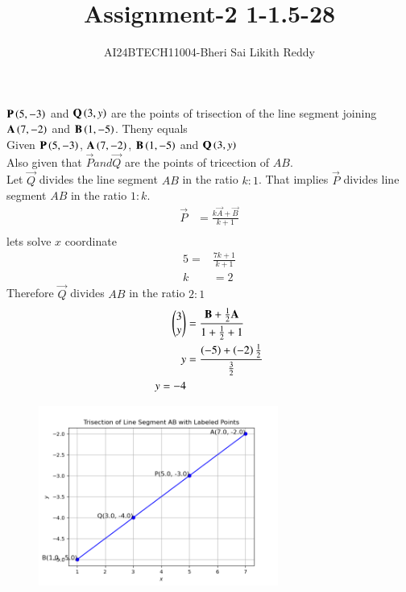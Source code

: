 \documentclass[journal]{IEEEtran}
\begin{document}

\onecolumn
\newpage
\title{Assignment-2  1-1.5-28}
\author{AI24BTECH11004-Bheri Sai Likith Reddy}
\maketitle
 $\mathbf{P}\left(5,-3\right)$ and $\mathbf{Q}\left(3,y\right)$ are the points of trisection of the line segment joining $\mathbf{A}\left(7,-2\right)$ and $\mathbf{B}\left(1,-5\right)$. Theny equals\\
\solution Given $\mathbf{P}\left(5,-3\right)$, $\mathbf{A}\left(7,-2\right)$, $\mathbf{B}\left(1,-5\right)$ and $\mathbf{Q}\left(3,y\right)$\\
Also given that $\vec{P} and \vec{Q} $ are the points of tricection of $AB$.\\
Let $\vec{Q}$ divides the line segment $AB$ in the ratio $k:1$.
That implies $\vec{P}$ divides line segment $AB$ in the ratio $1:k$.
\begin{align*}
	\vec{P}&= \frac{k\vec{A} +\vec{B}}{k+1}\\
\end{align*}
lets solve $x$ coordinate
\begin{align*}
	5=&\frac{7k+1}{k+1}\\
	k&=2
\end{align*}
Therefore $\vec{Q}$ divides $AB$ in the ratio $2:1$\\
\begin{align*}
	\begin{pmatrix}3\\ y\end{pmatrix}&=\frac{\mathbf{B} +\frac{1}{2}\mathbf{A} }{1+\frac{1}{2}+1 }\\
	y&=\frac{\left(-5\right)+\left(-2\right)\frac{1}{2}}{\frac{3}{2}}\\
	y=-4
\end{align*}
\begin{table}[h!]
	\centering
	
\end{table}
\begin{figure}[h!]
    \centering
    \includegraphics[width=0.7\textwidth]{figs/figasgn2.png}
\end{figure}
\end{document}
